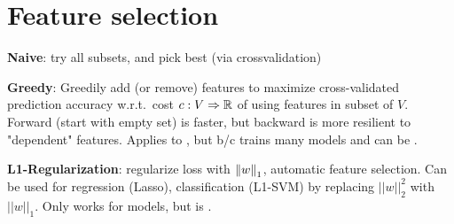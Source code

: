 \section{Feature selection}
\textbf{Naive}: try all subsets, and pick best (via crossvalidation)

\textbf{Greedy}: Greedily add (or remove) features to maximize cross-validated prediction accuracy w.r.t.\ cost $c: V \Rightarrow \mathbb{R}$ of using features in subset of $V$. Forward (start with empty set) is faster, but backward is more resilient to "dependent" features. Applies to , but  b/c trains many models and can be .

\textbf{L1-Regularization}: regularize loss with $\left\lVert w\right\rVert_1$, automatic feature
selection. Can be used for regression (Lasso), classification (L1-SVM) by replacing $||w||_2^2$ with $||w||_1$. Only works for  models, but is .

